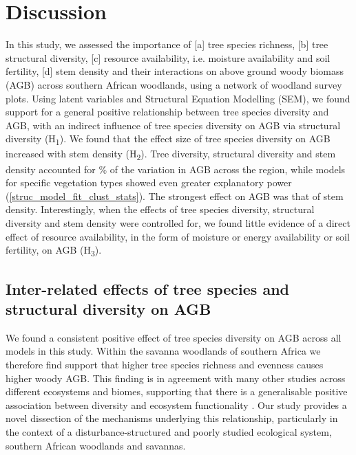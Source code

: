 \documentclass[11pt,a4paper]{article}
\begin{document}
\section*{Discussion}


In this study, we assessed the importance of [a] tree species richness, [b] tree structural diversity, [c] resource availability, i.e. moisture availability and soil fertility, [d] stem density and their interactions on above ground woody biomass (AGB) across southern African woodlands, using a network of \nplots{} woodland survey plots. Using latent variables and Structural Equation Modelling (SEM), we found support for a general positive relationship between tree species diversity and AGB, with an indirect influence of tree species diversity on AGB via structural diversity (H\textsubscript{1}). We found that the effect size of tree species diversity on AGB increased with stem density (H\textsubscript{2}).  Tree diversity, structural diversity and stem density accounted for \srsq{}\% of the variation in AGB across the region, while models for specific vegetation types showed even greater explanatory power (\autoref{struc_model_fit_clust_stats}). The strongest effect on AGB was that of stem density. Interestingly, when the effects of tree species diversity, structural diversity and stem density were controlled for, we found little evidence of a direct effect of resource availability, in the form of moisture or energy availability or soil fertility, on AGB (H\textsubscript{3}). 

\subsection*{Inter-related effects of tree species and structural diversity on AGB}

We found a consistent positive effect of tree species diversity on AGB across all models in this study. Within the savanna woodlands of southern Africa we therefore find support that higher tree species richness and evenness causes higher woody AGB. This finding is in agreement with many other studies across different ecosystems and biomes, supporting that there is a generalisable positive association between diversity and ecosystem functionality \citep{Liang2016, Cardinale2009}. Our study provides a novel dissection of the mechanisms underlying this relationship, particularly in the context of a disturbance-structured  and poorly studied ecological system, southern African woodlands and savannas.
\end{document}
